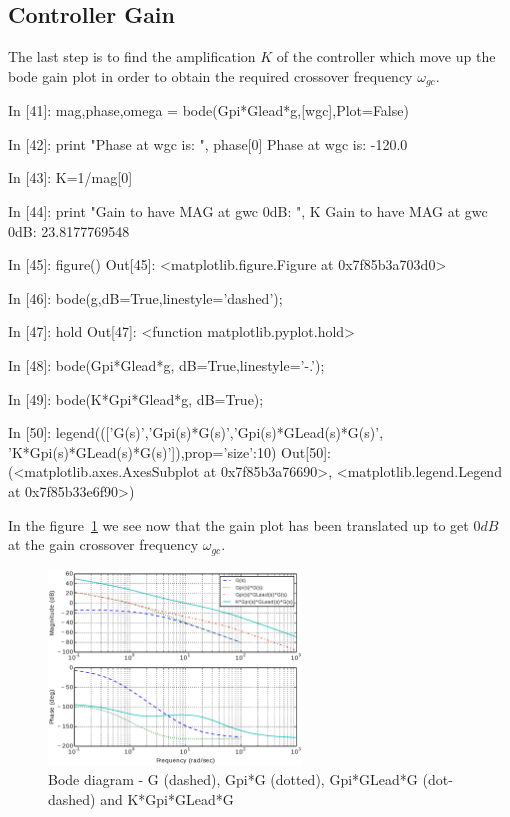 \subsection{Controller Gain}

The last step is to find the amplification $K$ of the controller which move up 
the bode gain plot in order to obtain the required crossover frequency 
$\omega_{gc}$.

\begin{code}
In [41]: mag,phase,omega = bode(Gpi*Glead*g,[wgc],Plot=False)

In [42]: print "Phase at wgc is: ", phase[0]
Phase at wgc is:  -120.0

In [43]: K=1/mag[0]

In [44]: print "Gain to have MAG at gwc 0dB: ", K
Gain to have MAG at gwc 0dB:  23.8177769548

In [45]: figure()
Out[45]: <matplotlib.figure.Figure at 0x7f85b3a703d0>

In [46]: bode(g,dB=True,linestyle='dashed');

In [47]: hold
Out[47]: <function matplotlib.pyplot.hold>

In [48]: bode(Gpi*Glead*g, dB=True,linestyle='-.');

In [49]: bode(K*Gpi*Glead*g, dB=True);

In [50]: 
legend((['G(s)','Gpi(s)*G(s)','Gpi(s)*GLead(s)*G(s)',
'K*Gpi(s)*GLead(s)*G(s)']),prop={'size':10})
Out[50]: 
(<matplotlib.axes.AxesSubplot at 0x7f85b3a76690>,
 <matplotlib.legend.Legend at 0x7f85b33e6f90>)
\end{code}

In the figure~\ref{F13} we see now that the gain plot has been translated up to 
get $0dB$ at the gain crossover frequency $\omega_{gc}$.

\begin{figure}[htbp]	%
\centering
\includegraphics[width=0.6\textwidth]{eps/bodeplantpileadK.eps}
\caption{Bode diagram - G (dashed), Gpi*G (dotted), Gpi*GLead*G (dot-dashed) 
and K*Gpi*GLead*G}
\label{F13}
\end{figure}

